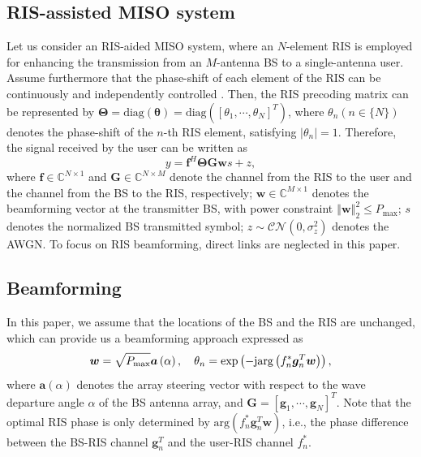\documentclass[conference,10pt,twocolumn]{IEEEtran}
\theoremstyle{nonumberplain}
\def \diag {\text{diag}}
\def \exp {\text{exp}}
\def \arg {\text{arg}}
\begin{document}
\subsection{RIS-assisted MISO system}\label{RIS-assisted MISO system}
    Let us consider an RIS-aided MISO system, where an $N$-element RIS is employed for enhancing the transmission from an $M$-antenna \ac{BS} to a single-antenna user. 
    Assume furthermore that the phase-shift of each element of the RIS can be continuously and independently controlled \cite{wu2019intelligent}. Then, the RIS precoding matrix can be represented by $\bm \Theta = \diag \left(\bm \theta\right )=\diag \left(\left[\theta_{1},\cdots ,\theta_{N}\right]^{T}\right)$,
    where $\theta_n (n\in \{N\})$ denotes the phase-shift of the $n$-th RIS element, satisfying $\lvert \theta_n\rvert=1$. Therefore, the signal received by the user can be written as 
    \begin{equation}
        \label{Signal model}
        y=\bm f^{H} \bm\Theta \bm G \bm w s+z,
    \end{equation}
    where $\bm f\in \mathbb C ^{N\times 1}$ and $\bm G \in \mathbb C^{N\times M}$ denote the channel from the RIS to the user and the channel from the BS to the RIS, respectively; $\bm w\in \mathbb C^{M\times 1}$ denotes the beamforming vector at the transmitter BS, with power constraint $\left\Vert \bm w\right \Vert_{2}^{2}\leq P_{\text{max}}$; $s$ denotes the normalized BS transmitted symbol; $z\sim \mathcal{CN}\left(0,\sigma_{z}^{2}\right)$ denotes the \ac{AWGN}. To focus on RIS beamforming, direct links are neglected in this paper. 

\subsection{Beamforming} 
    \label{Beamforming}
    In this paper, we assume that the locations of the \ac{BS} and the RIS are unchanged, which can provide us a beamforming approach expressed as
    \begin{equation}
        \label{traditional beamforming}
        \bm w=\sqrt{P_{\rm max}}\bm a\left(\alpha\right),\quad \theta_{n} = \exp\left(-{\rm j} \arg\left(f_{n}^{*}\bm g_{n}^{T}\bm w\right)\right),
    \end{equation}
    where $\bm a(\alpha)$ denotes the array steering vector with respect to the wave departure angle $\alpha$ of the BS antenna array, and $\bm G = \left[\bm g_{1}, \cdots, \bm g_{N}\right]^{T}$. Note that the optimal RIS phase is only determined by $\arg\left(f_{n}^{*}\bm g_{n}^{T}\bm w\right)$, i.e., the phase difference between the BS-RIS channel $\bm g_n^T$ and the user-RIS channel $f_n^*$. 
\end{document}
